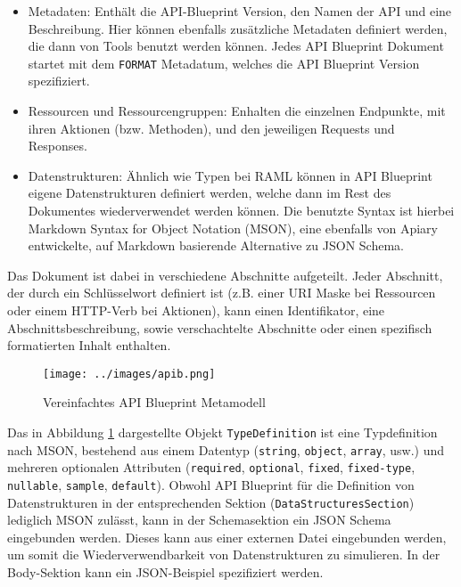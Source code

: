 \begin{itemize}
	\item Metadaten: Enthält die API-Blueprint Version, den Namen der API und eine Beschreibung. Hier können ebenfalls zusätzliche Metadaten definiert werden, die dann von Tools benutzt werden können. Jedes API Blueprint Dokument startet mit dem \lstinline|FORMAT| Metadatum, welches die API Blueprint Version spezifiziert.
	\item Ressourcen und Ressourcengruppen: Enhalten die einzelnen Endpunkte, mit ihren Aktionen (bzw. Methoden), und den jeweiligen Requests und Responses.
	\item Datenstrukturen: Ähnlich wie Typen bei RAML können in API Blueprint eigene Datenstrukturen definiert werden, welche dann im Rest des Dokumentes wiederverwendet werden können. Die benutzte Syntax ist hierbei Markdown Syntax for Object Notation (MSON), eine ebenfalls von Apiary entwickelte, auf Markdown basierende  Alternative zu JSON Schema.
\end{itemize}

Das Dokument ist dabei in verschiedene Abschnitte aufgeteilt. Jeder Abschnitt, der durch ein Schlüsselwort definiert ist (z.B. einer URI Maske bei Ressourcen oder einem HTTP-Verb bei Aktionen), kann einen Identifikator, eine Abschnittsbeschreibung, sowie verschachtelte Abschnitte oder einen spezifisch formatierten Inhalt enthalten. 

\begin{figure}[H]
  \texttt{[image: ../images/apib.png]}
  \caption{Vereinfachtes API Blueprint Metamodell}
  \label{fig:apib}
\end{figure}

Das in Abbildung \ref{fig:apib} dargestellte Objekt \lstinline|TypeDefinition| ist eine Typdefinition nach MSON, bestehend aus einem Datentyp (\lstinline|string|, \lstinline|object|, \lstinline|array|, usw.) und mehreren optionalen Attributen (\lstinline|required|, \lstinline|optional|, \lstinline|fixed|, \lstinline|fixed-type|, \lstinline|nullable|, \lstinline|sample|, \lstinline|default|). Obwohl API Blueprint für die Definition von Datenstrukturen in der entsprechenden Sektion (\lstinline|DataStructuresSection|) lediglich MSON zulässt, kann in der Schemasektion ein JSON Schema eingebunden werden. Dieses kann aus einer externen Datei eingebunden werden, um somit die Wiederverwendbarkeit von Datenstrukturen zu simulieren. In der Body-Sektion kann ein JSON-Beispiel spezifiziert werden. \\

